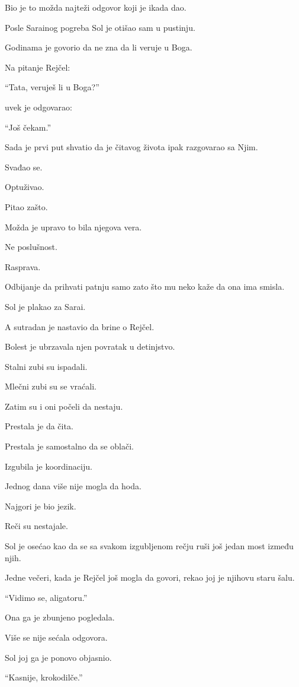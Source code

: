 Bio je to možda najteži odgovor koji je ikada dao.

\bigskip

Posle Sarainog pogreba Sol je otišao sam u pustinju.

Godinama je govorio da ne zna da li veruje u Boga.

Na pitanje Rejčel:

``Tata, veruješ li u Boga?''

uvek je odgovarao:

``Još čekam.''

Sada je prvi put shvatio da je čitavog života ipak razgovarao sa Njim.

Svađao se.

Optuživao.

Pitao zašto.

Možda je upravo to bila njegova vera.

Ne poslušnost.

Rasprava.

Odbijanje da prihvati patnju samo zato što mu neko kaže da ona ima smisla.

Sol je plakao za Sarai.

A sutradan je nastavio da brine o Rejčel.

\bigskip

Bolest je ubrzavala njen povratak u detinjstvo.

Stalni zubi su ispadali.

Mlečni zubi su se vraćali.

Zatim su i oni počeli da nestaju.

Prestala je da čita.

Prestala je samostalno da se oblači.

Izgubila je koordinaciju.

Jednog dana više nije mogla da hoda.

Najgori je bio jezik.

Reči su nestajale.

Sol je osećao kao da se sa svakom izgubljenom rečju ruši još jedan most između njih.

Jedne večeri, kada je Rejčel još mogla da govori, rekao joj je njihovu staru šalu.

``Vidimo se, aligatoru.''

Ona ga je zbunjeno pogledala.

Više se nije sećala odgovora.

Sol joj ga je ponovo objasnio.

``Kasnije, krokodilče.''

